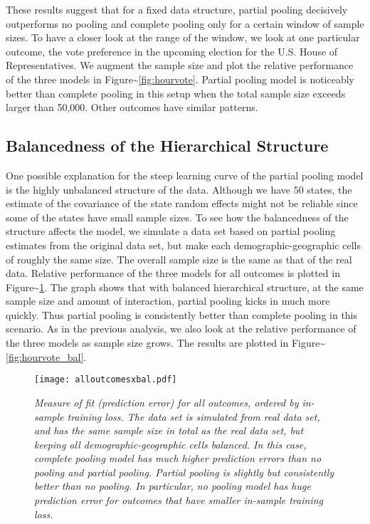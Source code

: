 These results suggest that for a fixed data structure, partial pooling
decisively outperforms no pooling and complete pooling only for a
certain window of sample sizes. To have a closer look at the range of
the window, we look at one particular outcome, the vote preference in
the upcoming election for the U.S. House of Representatives. We augment
the sample size and plot the relative performance of the three models in
Figure\textasciitilde{}\ref{fig:hourvote}. Partial pooling model is
noticeably better than complete pooling in this setup when the total
sample size exceeds larger than 50,000. Other outcomes have similar
patterns.

\subsection{Balancedness of the Hierarchical
Structure}\label{balancedness-of-the-hierarchical-structure}

One possible explanation for the steep learning curve of the partial
pooling model is the highly unbalanced structure of the data. Although
we have 50 states, the estimate of the covariance of the state random
effects might not be reliable since some of the states have small sample
sizes. To see how the balancedness of the structure affects the model,
we simulate a data set based on partial pooling estimates from the
original data set, but make each demographic-geographic cells of roughly
the same size. The overall sample size is the same as that of the real
data. Relative performance of the three models for all outcomes is
plotted in Figure\textasciitilde{}\ref{fig:figbal}. The graph shows that
with balanced hierarchical structure, at the same sample size and amount
of interaction, partial pooling kicks in much more quickly. Thus partial
pooling is consistently better than complete pooling in this scenario.
As in the previous analysis, we also look at the relative performance of
the three models as sample size grows. The results are plotted in
Figure\textasciitilde{}\ref{fig:hourvote_bal}.

\begin{figure}[p!]
  \centering
  \texttt{[image: alloutcomesxbal.pdf]}
  \caption{\em Measure of fit (prediction error) for all outcomes, ordered by
    in-sample training loss. The data set is simulated from real data set, and
    has the same sample size in total as the real data set, but keeping all
    demographic-geographic cells balanced. In this case, complete pooling model
    has much higher prediction errors than no pooling and partial
    pooling. Partial pooling is slightly but consistently better than no
    pooling. In particular, no pooling model has huge prediction error for
    outcomes that have smaller in-sample training loss.}
  \label{fig:figbal}
\end{figure}

